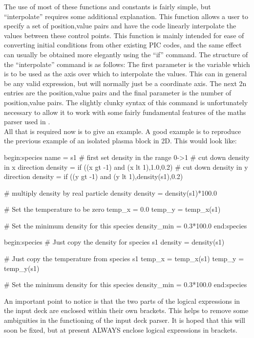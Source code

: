 The use of most of these functions and constants is fairly simple, but
``interpolate'' requires some additional explanation. This function allows a
user to specify a set of position,value pairs and have the code linearly
interpolate the values between these control points. This function is mainly
intended for ease of converting initial conditions from other existing PIC
codes, and the same effect can usually be obtained more elegantly using the
``if'' command. The structure of the ``interpolate'' command is as follows:
The first parameter is the variable which is to be used as the axis over which
to interpolate the values. This can in general be any valid expression, but
will normally just be a coordinate axis. The next 2n entries are the
position,value pairs and the final parameter is the number of position,value
pairs. The slightly clunky syntax of this command is unfortunately necessary to
allow it to work with some fairly fundamental features of the maths parser
used in {\EPOCH}.\\
All that is required now is to give an example.
A good example is to reproduce
the previous example of an isolated plasma block in 2D. This would look like:
\begin{boxverbatim}
begin:species
   name = s1
   # first set density in the range 0->1
   # cut down density in x direction
   density = if ((x gt -1) and (x lt 1),1.0,0.2)
   # cut down density in y direction
   density = if ((y gt -1) and (y lt 1),density(s1),0.2)

   # multiply density by real particle density
   density = density(s1)*100.0

   # Set the temperature to be zero
   temp_x = 0.0
   temp_y = temp_x(s1)

   # Set the minimum density for this species
   density_min = 0.3*100.0
end:species

begin:species
   # Just copy the density for species s1
   density = density(s1)

   # Just copy the temperature from species s1
   temp_x = temp_x(s1)
   temp_y = temp_y(s1)

   # Set the minimum density for this species
   density_min = 0.3*100.0
end:species
\end{boxverbatim}

An important point to notice is that the two parts of the logical expressions
in the input deck are enclosed within their own brackets. This helps to remove
some ambiguities in the functioning of the input deck parser. It is hoped that
this will soon be fixed, but at present ALWAYS enclose logical expressions in
brackets.

